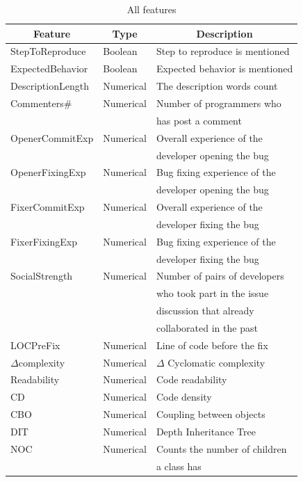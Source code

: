 \documentclass[sigconf,review]{acmart}
\begin{document}
\begin{table}[h]
\caption{All features} \label{weka:features}
\begin{tabular}{lll}
\hline
\hline
\multicolumn{1}{c}{Feature}
& \multicolumn{1}{c}{Type}
& \multicolumn{1}{c}{Description}    \\  
\hline  
  StepToReproduce     & Boolean & Step to reproduce is mentioned \\
  ExpectedBehavior    & Boolean & Expected behavior is mentioned \\
  DescriptionLength   & Numerical & The description words count\\
  Commenters\#    & Numerical & Number of programmers who \\&& has post a comment \\

   OpenerCommitExp & Numerical & Overall experience of the \\&& developer opening the bug \\     
   OpenerFixingExp & Numerical & Bug fixing experience of the \\&& developer opening the bug \\
   FixerCommitExp & Numerical & Overall experience of the \\&& developer fixing the bug\\
   FixerFixingExp & Numerical & Bug fixing experience of the \\&& developer fixing the bug\\
   SocialStrength      & Numerical & Number of pairs of developers \\&&who took part in the issue \\&&discussion that already \\&&collaborated in the past\\

   LOCPreFix      &Numerical& Line of code before the fix\\
   $\Delta$complexity   &Numerical& $\Delta$ Cyclomatic complexity\\
   Readability      &Numerical& Code readability\\
   CD           &Numerical& Code density\\

   
   CBO &Numerical& Coupling between objects \\

  DIT &Numerical& Depth Inheritance Tree \\

NOC &Numerical&  Counts the number of children \\&&a class has\\


\end{tabular}
\end{table}
\end{document}
